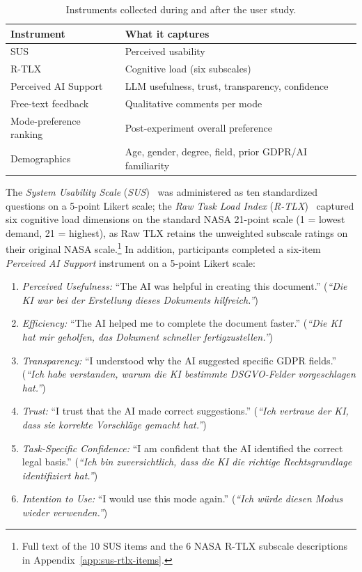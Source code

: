 \begin{table}[htbp]
\centering
\begin{tabularx}{\linewidth}{@{}l X@{}}
\toprule
Instrument & What it captures \\
\midrule
SUS                       & Perceived usability \\
R-TLX                     & Cognitive load (six subscales) \\
Perceived AI Support      & LLM usefulness, trust, transparency, confidence \\
Free-text feedback        & Qualitative comments per mode \\
Mode-preference ranking   & Post-experiment overall preference \\
Demographics              & Age, gender, degree, field, prior GDPR/AI familiarity \\
\bottomrule
\end{tabularx}
\caption{Instruments collected during and after the user study.}
\label{tab:instruments-overview}
\end{table}

The \textit{System Usability Scale} (\textit{SUS})~\cite{Brooke1996} was administered as ten standardized questions on a 5-point Likert scale; the \textit{Raw Task Load Index} (\textit{R-TLX})~\cite{Hart1988,Hart2006} captured six cognitive load dimensions on the standard NASA 21-point scale (1 = lowest demand, 21 = highest), as Raw TLX retains the unweighted subscale ratings on their original NASA scale.\footnote{Full text of the 10 SUS items and the 6 NASA R-TLX subscale descriptions in Appendix~\ref{app:sus-rtlx-items}.} In addition, participants completed a six-item \textit{Perceived AI Support} instrument on a 5-point Likert scale:

\begin{enumerate}
    \item \textit{Perceived Usefulness:} ``The AI was helpful in creating this document.'' (\textit{``Die KI war bei der Erstellung dieses Dokuments hilfreich.''})
    \item \textit{Efficiency:} ``The AI helped me to complete the document faster.'' (\textit{``Die KI hat mir geholfen, das Dokument schneller fertigzustellen.''})
    \item \textit{Transparency:} ``I understood why the AI suggested specific GDPR fields.'' (\textit{``Ich habe verstanden, warum die KI bestimmte DSGVO-Felder vorgeschlagen hat.''})
    \item \textit{Trust:} ``I trust that the AI made correct suggestions.'' (\textit{``Ich vertraue der KI, dass sie korrekte Vorschläge gemacht hat.''})
    \item \textit{Task-Specific Confidence:} ``I am confident that the AI identified the correct legal basis.'' (\textit{``Ich bin zuversichtlich, dass die KI die richtige Rechtsgrundlage identifiziert hat.''})
    \item \textit{Intention to Use:} ``I would use this mode again.'' (\textit{``Ich würde diesen Modus wieder verwenden.''})
\end{enumerate}

